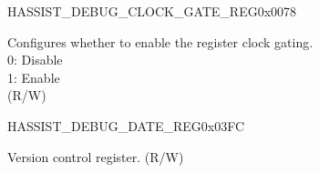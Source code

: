 \begin{register}{H}{ASSIST\_DEBUG\_CLOCK\_GATE\_REG}{0x0078}\label{regdesc:ASSISTDEBUGCLOCKGATEREG}
%
%
\regnewline%
\begin{regdesc}\begin{reglist}
\label{fielddesc:ASSISTDEBUGCLKEN}\item [ASSIST\_DEBUG\_CLK\_EN] Configures whether to enable the register clock gating. \\
0: Disable\\
1: Enable\\
(R/W)
\end{reglist}\end{regdesc}
\end{register}


\begin{register}{H}{ASSIST\_DEBUG\_DATE\_REG}{0x03FC}\label{regdesc:ASSISTDEBUGDATEREG}
%
%
\regnewline%
\begin{regdesc}\begin{reglist}
\label{fielddesc:ASSISTDEBUGDATE}\item [ASSIST\_DEBUG\_DATE] Version control register. (R/W)
\end{reglist}\end{regdesc}
\end{register}
